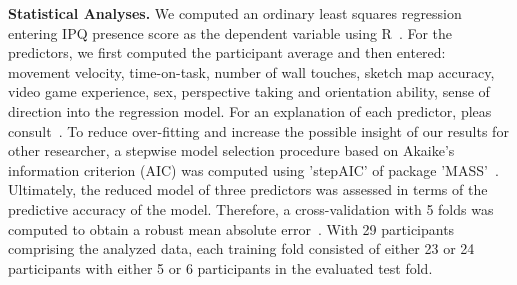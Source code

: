 \indent \textbf{Statistical Analyses.} We computed an ordinary least squares regression entering IPQ presence score as the dependent variable using R~\cite{rver}. For the predictors, we first computed the participant average and then entered: movement velocity, time-on-task, number of wall touches, sketch map accuracy, video game experience, sex, perspective taking and orientation ability, sense of direction into the regression model. For an explanation of each predictor, pleas consult~\cite{gehrke2018}. To reduce over-fitting and increase the possible insight of our results for other researcher, a stepwise model selection procedure based on Akaike's information criterion (AIC) was computed using 'stepAIC' of package 'MASS'~\cite{aic, mass}.
Ultimately, the reduced model of three predictors was assessed in terms of the predictive accuracy of the model. Therefore, a cross-validation with 5 folds was computed to obtain a robust mean absolute error~\cite{cv, mae}. With 29 participants comprising the analyzed data, each training fold consisted of either 23 or 24 participants with either 5 or 6 participants in the evaluated test fold.

